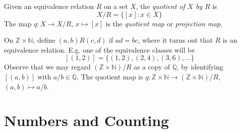 \documentclass[10pt, a4paper, twoside]{report}
\begin{document}
Given an equivalence relation \(R\) on a set \(X\), the \emph{quotient of \(X\) by \(R\)} is 
\[X/R=\{[x]:x\in X\}\]
The map \(q:X\to X/R\), \(x\mapsto [x]\) is the \emph{quotient map} or \emph{projection map}.
\begin{example}
    On \(\mathbb{Z}\times\mathbb{N}\), define \((a,b)R(c,d)\) if \(ad=bc\), where it turns out that \(R\) is an equivalence relation. E.g. one of the equivalence classes will be 
    \[[(1,2)]=\{(1,2),(2,4),(3,6),\ldots\}\]
    Observe that we may regard \((\mathbb{Z}\times\mathbb{N})/R\) as a copy of \(\mathbb{Q}\), by identifying \([(a,b)]\) with \(a/b\in\mathbb{Q}\). The quotient map is \(q:\mathbb{Z}\times\mathbb{N}\to(\mathbb{Z}\times\mathbb{N})/R\), \((a,b)\mapsto a/b\).
\end{example}
\section{Numbers and Counting}
\end{document}
